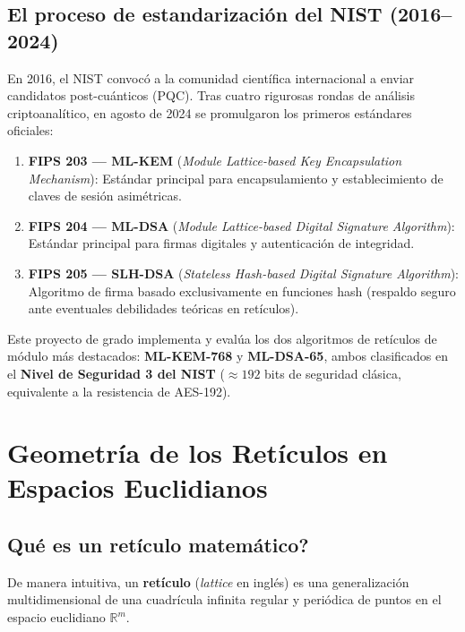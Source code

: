 \documentclass[11pt,a4paper,twoside,openright]{book}
\theoremstyle{plain}
\theoremstyle{definition}
\theoremstyle{remark}
\newcommand{\R}{\mathbb{R}}
\begin{document}
\section{El proceso de estandarizaci\'on del NIST (2016--2024)}

En 2016, el NIST convoc\'o a la comunidad cient\'ifica internacional a enviar candidatos post-cu\'anticos (PQC). Tras cuatro rigurosas rondas de an\'alisis criptoanal\'itico, en agosto de 2024 se promulgaron los primeros est\'andares oficiales:

\begin{enumerate}
  \item \textbf{FIPS 203 --- ML-KEM} (\emph{Module Lattice-based Key Encapsulation Mechanism}): Est\'andar principal para encapsulamiento y establecimiento de claves de sesi\'on asim\'etricas.
  \item \textbf{FIPS 204 --- ML-DSA} (\emph{Module Lattice-based Digital Signature Algorithm}): Est\'andar principal para firmas digitales y autenticaci\'on de integridad.
  \item \textbf{FIPS 205 --- SLH-DSA} (\emph{Stateless Hash-based Digital Signature Algorithm}): Algoritmo de firma basado exclusivamente en funciones hash (respaldo seguro ante eventuales debilidades te\'oricas en ret\'iculos).
\end{enumerate}

Este proyecto de grado implementa y eval\'ua los dos algoritmos de ret\'iculos de m\'odulo m\'as destacados: \textbf{ML-KEM-768} y \textbf{ML-DSA-65}, ambos clasificados en el \textbf{Nivel de Seguridad 3 del NIST} ($\approx 192$ bits de seguridad cl\'asica, equivalente a la resistencia de AES-192).

\chapter{Geometr\'ia de los Ret\'iculos en Espacios Euclidianos}
\label{chap:geometria_reticulos}

\section{\textquestiondown Qu\'e es un ret\'iculo matem\'atico?}

De manera intuitiva, un \textbf{ret\'iculo} (\emph{lattice} en ingl\'es) es una generalizaci\'on multidimensional de una cuadr\'icula infinita regular y peri\'odica de puntos en el espacio euclidiano $\R^m$. 
\end{document}

